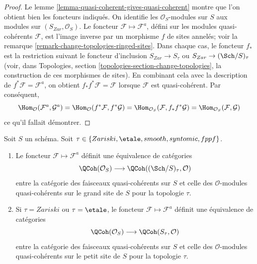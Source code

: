 \begin{proof}
Le lemme \ref{lemma-quasi-coherent-gives-quasi-coherent} montre que l'on
obtient bien les foncteurs indiqués. On identifie les
$\mathcal{O}_S$-modules sur $S$ aux modules sur
$(S_{Zar}, \mathcal{O}_S)$. Le foncteur
$\mathcal{F} \mapsto \mathcal{F}^a$, défini sur les modules
quasi-cohérents $\mathcal{F}$, est l'image inverse par un morphisme $f$
de sites annelés; voir la remarque
\ref{remark-change-topologies-ringed-sites}. Dans chaque cas, le foncteur
$f_*$ est la restriction suivant le foncteur d'inclusion
$S_{Zar} \to S_\tau$ ou $S_{Zar} \to (\Sch/S)_\tau$ (voir, dans
Topologies, section \ref{topologies-section-change-topologies}, la
construction de ces morphismes de sites). En combinant cela avec la
description de $f^*\mathcal{F} = \mathcal{F}^a$, on obtient
$f_*f^*\mathcal{F} = \mathcal{F}$ lorsque $\mathcal{F}$ est
quasi-cohérent. Par conséquent,
$$
\Hom_\mathcal{O}(\mathcal{F}^a, \mathcal{G}^a) =
\Hom_\mathcal{O}(f^*\mathcal{F}, f^*\mathcal{G}) =
\Hom_{\mathcal{O}_S}(\mathcal{F}, f_*f^*\mathcal{G}) =
\Hom_{\mathcal{O}_S}(\mathcal{F}, \mathcal{G})
$$
ce qu'il fallait démontrer.
\end{proof}

\begin{proposition}
\label{proposition-equivalence-quasi-coherent}
Soit $S$ un schéma.
Soit $\tau \in \{Zariski, \linebreak[0] \etale, \linebreak[0]
smooth, \linebreak[0] syntomic, \linebreak[0] fppf\}$.
\begin{enumerate}
\item Le foncteur $\mathcal{F} \mapsto \mathcal{F}^a$ définit une
équivalence de catégories
$$
\QCoh(\mathcal{O}_S)
\longrightarrow
\QCoh((\Sch/S)_\tau, \mathcal{O})
$$
entre la catégorie des faisceaux quasi-cohérents sur $S$ et celle des
$\mathcal{O}$-modules quasi-cohérents sur le grand site de $S$ pour la
topologie $\tau$.
\item Si $\tau = Zariski$ ou $\tau = \etale$, le foncteur
$\mathcal{F} \mapsto \mathcal{F}^a$ définit une équivalence de catégories
$$
\QCoh(\mathcal{O}_S)
\longrightarrow
\QCoh(S_\tau, \mathcal{O})
$$
entre la catégorie des faisceaux quasi-cohérents sur $S$ et celle des
$\mathcal{O}$-modules quasi-cohérents sur le petit site de $S$ pour la
topologie $\tau$.
\end{enumerate}
\end{proposition}

